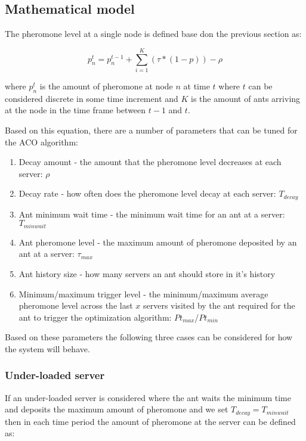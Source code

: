 \subsection{Mathematical model}

The pheromone level at a single node is defined base don the previous section as:

\begin{equation}
p^{t}_{n} = p^{t-1}_{n} + \sum_{i=1}^{K}(\tau * (1 - p)) - \rho
\end{equation}

where $p^{t}_{n}$ is the amount of pheromone at node $n$ at time $t$ where $t$ can be considered discrete in some time increment and $K$ is the amount of ants arriving at the node in the time frame between $t-1$ and $t$.

Based on this equation, there are a number of parameters that can be tuned for the ACO algorithm:

\begin{enumerate}
	\item Decay amount - the amount that the pheromone level decreases at each server: $\rho$
	\item Decay rate - how often does the pheromone level decay at each server: $T_{decay}$
	\item Ant minimum wait time - the minimum wait time for an ant at a server: $T_{minwait}$
	\item Ant pheromone level - the maximum amount of pheromone deposited by an ant at a server: $\tau_{max}$
	\item Ant history size - how many servers an ant should store in it's history
	\item Minimum/maximum trigger level - the minimum/maximum average pheromone level across the last $x$ servers visited by the ant required for the ant to trigger the optimization algorithm: $Pt_{max}$/$Pt_{min}$
\end{enumerate}

Based on these parameters the following three cases can be considered for how the system will behave.

\subsubsection{Under-loaded server}

If an under-loaded server is considered where the ant waits the minimum time and deposits the maximum amount of pheromone and we set $T_{decay} = T_{minwait}$ then in each time period the amount of pheromone at the server can be defined as:

